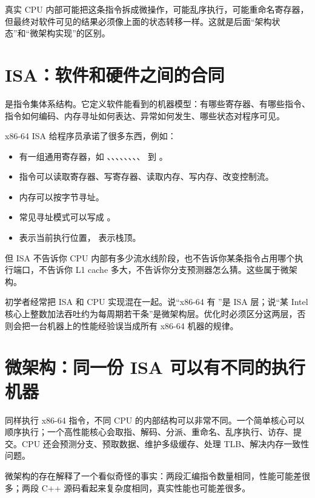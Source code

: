 真实 CPU 内部可能把这条指令拆成微操作，可能乱序执行，可能重命名寄存器，但最终对软件可见的结果必须像上面的状态转移一样。这就是后面“架构状态”和“微架构实现”的区别。

\section{ISA：软件和硬件之间的合同}

 是指令集体系结构。它定义软件能看到的机器模型：有哪些寄存器、有哪些指令、指令如何编码、内存寻址如何表达、异常如何发生、哪些状态对程序可见。

x86-64 ISA 给程序员承诺了很多东西，例如：

\begin{itemize}
  \item 有一组通用寄存器，如 、、、、、、、、 到 。
  \item 指令可以读取寄存器、写寄存器、读取内存、写内存、改变控制流。
  \item 内存可以按字节寻址。
  \item 常见寻址模式可以写成 。
  \item {} 表示当前执行位置， 表示栈顶。
\end{itemize}

但 ISA 不告诉你 CPU 内部有多少流水线阶段，也不告诉你某条指令占用哪个执行端口，不告诉你 L1 cache 多大，不告诉你分支预测器怎么猜。这些属于微架构。

\begin{warningbox}
初学者经常把 ISA 和 CPU 实现混在一起。说“x86-64 有 ”是 ISA 层；说“某 Intel 核心上整数加法吞吐约为每周期若干条”是微架构层。优化时必须区分这两层，否则会把一台机器上的性能经验误当成所有 x86-64 机器的规律。
\end{warningbox}

\section{微架构：同一份 ISA 可以有不同的执行机器}

同样执行 x86-64 指令，不同 CPU 的内部结构可以非常不同。一个简单核心可以顺序执行；一个高性能核心会取指、解码、分派、重命名、乱序执行、访存、提交。CPU 还会预测分支、预取数据、维护多级缓存、处理 TLB、解决内存一致性问题。

微架构的存在解释了一个看似奇怪的事实：两段汇编指令数量相同，性能可能差很多；两段 C++ 源码看起来复杂度相同，真实性能也可能差很多。

